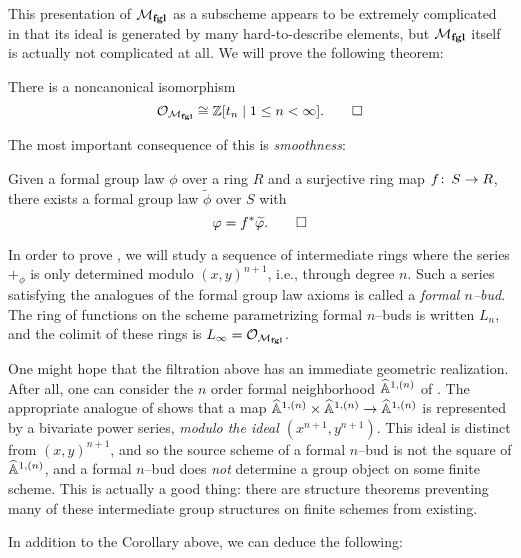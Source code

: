 This presentation of $\moduli{fgl}$ as a subscheme appears to be extremely complicated in that its ideal is generated by many hard-to-describe elements, but $\moduli{fgl}$ itself is actually not complicated at all.  We will prove the following theorem:
\begin{theorem}\label{LazardsTheorem}
There is a noncanonical isomorphism \[\sheaf{O}_{\moduli{fgl}} \cong \Z[t_n \mid 1 \le n < \infty]. \qed\]
\end{theorem}

The most important consequence of this is \emph{smoothness}:
\begin{corollary}
Given a formal group law $\phi$ over a ring $R$ and a surjective ring map $f\co S \to R$, there exists a formal group law $\widetilde \phi$ over $S$ with \[\phi = f^* \widetilde \phi. \qed\]
\end{corollary}

\begin{definition}
In order to prove , we will study a sequence of intermediate rings where the series $+_\phi$ is only determined modulo $(x, y)^{n+1}$, i.e., through degree $n$.  Such a series satisfying the analogues of the formal group law axioms is called a \textit{formal $n$--bud}.  The ring of functions on the scheme parametrizing formal $n$--buds is written $L_n$, and the colimit of these rings is $L_\infty = \sheaf{O}_{\moduli{fgl}}$.
\end{definition}

\begin{remark}
One might hope that the filtration above has an immediate geometric realization.  After all, one can consider the $n${\th} order formal neighborhood $\A^{1, (n)}$ of .  The appropriate analogue of  shows that a map $\A^{1, (n)} \times \A^{1, (n)} \to \A^{1, (n)}$ is represented by a bivariate power series, \emph{modulo the ideal $(x^{n+1}, y^{n+1})$}.  This ideal is distinct from $(x, y)^{n+1}$, and so the source scheme of a formal $n$--bud is not the square of $\A^{1, (n)}$, and a formal $n$--bud does \emph{not} determine a group object on some finite scheme.  This is actually a good thing: there are structure theorems preventing many of these intermediate group structures on finite schemes from existing.
\end{remark}

In addition to the Corollary above, we can deduce the following:

